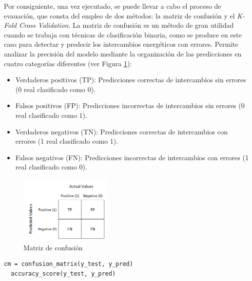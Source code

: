 \vspace{3mm}

Por consiguiente, una vez ejecutado, se puede llevar a cabo el proceso de evauación, que consta del empleo de dos métodos: la matriz de confusión y el \textit{K-Fold Cross Validation}. La matriz de confusión \cite{cm} es un método de gran utilidad cuando se trabaja con técnicas de clasificación binaria, como se produce en este caso para detectar y predecir los intercambios energéticos con errores. Permite analizar la precisión del modelo mediante la organización de las predicciones en cuatro categorías diferentes (ver Figura \ref{fig:confusion}): 

\begin{itemize}
  \item Verdaderos positivos (TP): Predicciones correctas de intercambios sin errores (0 real clasificado como 0).
  \item Falsos positivos (FP): Predicciones incorrectas de intercambios sin errores (0 real clasificado como 1).
  \item Verdaderos negativos (TN): Predicciones correctas de intercambios con errores (1 real clasificado como 1).
  \item Falsos negativos (FN): Predicciones incorrectas de intercambios con errores (1 real clasificado como 0).
\end{itemize}

\begin{figure}[H]
  \centering
  \includegraphics[width=0.4\textwidth]{img/desarrollo/rf/confusion.png}
  \caption{Matriz de confusión \cite{cm2}}
  \label{fig:confusion}
\end{figure}

\vspace{3mm}

\begin{lstlisting}[style=Python, caption={Implementación de la matriz de confusión}]
  cm = confusion_matrix(y_test, y_pred)
  accuracy_score(y_test, y_pred)
\end{lstlisting}

\vspace{3mm}

